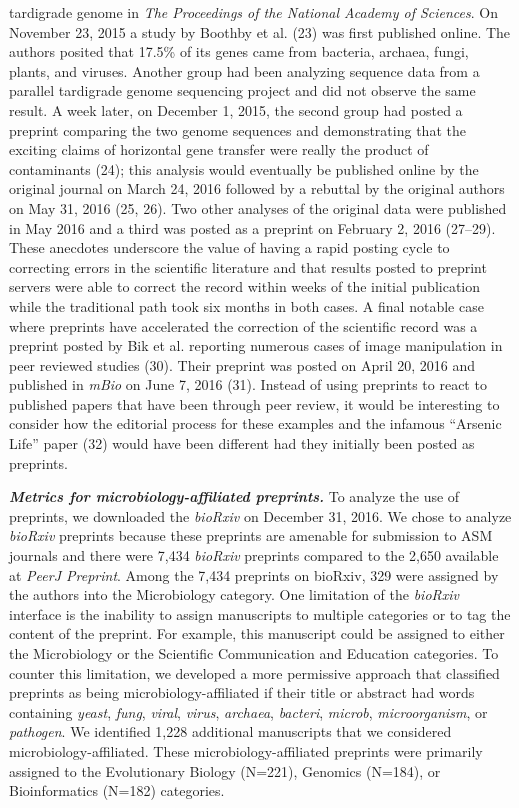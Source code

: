 \documentclass[11pt,]{article}
\begin{document}
tardigrade genome in \emph{The Proceedings of the National Academy of
Sciences}. On November 23, 2015 a study by Boothby et al. (23) was first
published online. The authors posited that 17.5\% of its genes came from
bacteria, archaea, fungi, plants, and viruses. Another group had been
analyzing sequence data from a parallel tardigrade genome sequencing
project and did not observe the same result. A week later, on December
1, 2015, the second group had posted a preprint comparing the two genome
sequences and demonstrating that the exciting claims of horizontal gene
transfer were really the product of contaminants (24); this analysis
would eventually be published online by the original journal on March
24, 2016 followed by a rebuttal by the original authors on May 31, 2016
(25, 26). Two other analyses of the original data were published in May
2016 and a third was posted as a preprint on February 2, 2016 (27--29).
These anecdotes underscore the value of having a rapid posting cycle to
correcting errors in the scientific literature and that results posted
to preprint servers were able to correct the record within weeks of the
initial publication while the traditional path took six months in both
cases. A final notable case where preprints have accelerated the
correction of the scientific record was a preprint posted by Bik et al.
reporting numerous cases of image manipulation in peer reviewed studies
(30). Their preprint was posted on April 20, 2016 and published in
\emph{mBio} on June 7, 2016 (31). Instead of using preprints to react to
published papers that have been through peer review, it would be
interesting to consider how the editorial process for these examples and
the infamous ``Arsenic Life'' paper (32) would have been different had
they initially been posted as preprints.

\textbf{\emph{Metrics for microbiology-affiliated preprints.}} To
analyze the use of preprints, we downloaded the \emph{bioRxiv} on
December 31, 2016. We chose to analyze \emph{bioRxiv} preprints because
these preprints are amenable for submission to ASM journals and there
were 7,434 \emph{bioRxiv} preprints compared to the 2,650 available at
\emph{PeerJ Preprint}. Among the 7,434 preprints on bioRxiv, 329 were
assigned by the authors into the Microbiology category. One limitation
of the \emph{bioRxiv} interface is the inability to assign manuscripts
to multiple categories or to tag the content of the preprint. For
example, this manuscript could be assigned to either the Microbiology or
the Scientific Communication and Education categories. To counter this
limitation, we developed a more permissive approach that classified
preprints as being microbiology-affiliated if their title or abstract
had words containing \emph{yeast}, \emph{fung}, \emph{viral},
\emph{virus}, \emph{archaea}, \emph{bacteri}, \emph{microb},
\emph{microorganism}, or \emph{pathogen}. We identified 1,228 additional
manuscripts that we considered microbiology-affiliated. These
microbiology-affiliated preprints were primarily assigned to the
Evolutionary Biology (N=221), Genomics (N=184), or Bioinformatics
(N=182) categories.
\end{document}
